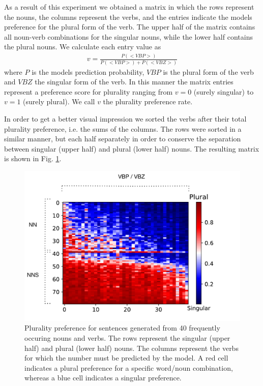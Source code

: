 As a result of this experiment we obtained a matrix in which 
the rows represent the nouns,
the columns represent the verbs, and
the entries indicate the models preference for the plural form of the verb. 
The upper half of the matrix contains all noun-verb combinations for the singular nouns, while the lower half contains the plural nouns. 
We calculate each entry value as
\begin{align*}
	v = \frac{P(<VBP>)}{P(<VBP>) + P(<VBZ>)} 
\end{align*}
where $P$ is the models prediction probability, $VBP$ is the plural 
form of the verb and $VBZ$ the singular form of the verb. 
In this manner the matrix entries represent 
a preference score for plurality ranging from
$v=0$ (surely singular) to $v=1$ (surely plural). 
We call $v$ the plurality preference rate. 

In order to get a better visual impression we sorted the verbs 
after their total plurality preference, i.e. the sums of the columns. 
The rows were sorted in a similar manner, but each half separately in order to conserve the separation between singular (upper half) and plural (lower half) nouns. The resulting matrix is shown in Fig. \ref{fig:matrix_ratio}.

    \begin{figure}[t]
    \centering
        \includegraphics[scale=0.5]{matrix_plot_ratio.pdf}
        \caption{Plurality preference for sentences generated from 40 frequently
        occuring nouns and verbs. The rows represent the 
        singular (upper half) and plural (lower half) nouns.
        The columns represent the verbs for which the number must
        be predicted by the model. 
        A red cell indicates a plural preference for a specific word/noun 
        combination, whereas a blue 
        cell indicates a singular preference. }
        \label{fig:matrix_ratio}
    \end{figure}

